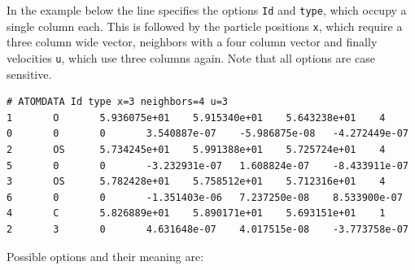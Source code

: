 In the example below the line specifies the options \texttt{Id} and \texttt{type}, which occupy a single column each. This is followed by the particle positions \texttt{x}, which require a three column wide vector, neighbors with a four column vector and finally velocities \texttt{u}, which use three columns again. Note that all options are case sensitive.
{\tiny
\begin{lstlisting}
# ATOMDATA Id type x=3 neighbors=4 u=3
1       O       5.936075e+01    5.915340e+01    5.643238e+01    4       0       0       0       3.540887e-07    -5.986875e-08   -4.272449e-07   
2       OS      5.734245e+01    5.991388e+01    5.725724e+01    4       5       0       0       -3.232931e-07   1.608824e-07    -8.433911e-07   
3       OS      5.782428e+01    5.758512e+01    5.712316e+01    4       6       0       0       -1.351403e-06   7.237250e-08    8.533900e-07    
4       C       5.826889e+01    5.890171e+01    5.693151e+01    1       2       3       0       4.631648e-07    4.017515e-08    -3.773758e-07  
\end{lstlisting}
}
Possible options and their meaning are:
